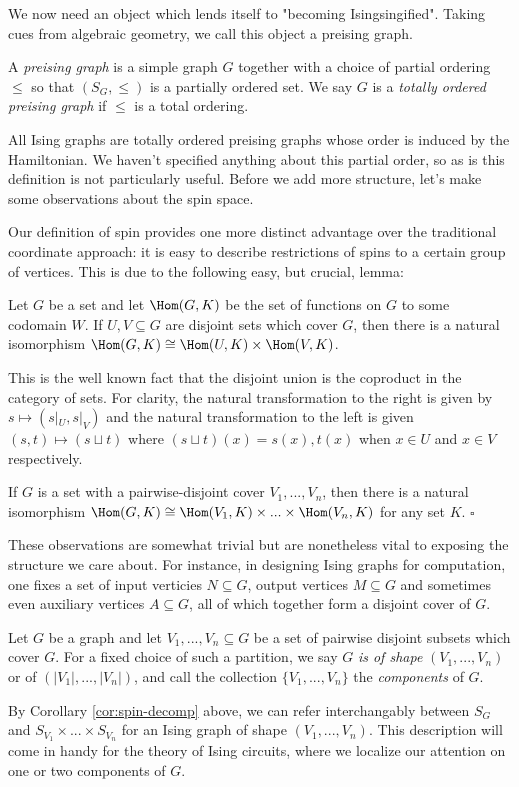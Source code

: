 We now need an object which lends itself to "becoming Isingsingified". Taking cues from algebraic geometry, we call this object a preising graph.
\begin{defn}\label{defn:preising-graph}
	A \emph{preising graph} is a simple graph $G$ together with a choice of partial ordering $\leq$ so that $(S_G,\leq)$ is a partially ordered set. We say $G$ is a \emph{totally ordered preising graph} if $\leq$ is a total ordering.
\end{defn}
All Ising graphs are totally ordered preising graphs whose order is induced by the Hamiltonian. We haven't specified anything about this partial order, so as is this definition is not particularly useful. Before we add more structure, let's make some observations about the spin space.

Our definition of spin provides one more distinct advantage over the traditional coordinate approach: it is easy to describe restrictions of spins to a certain group of vertices. This is due to the following easy, but crucial, lemma:
\begin{lem}\label{lem:spin-decomp}
	Let $G$ be a set and let $\Hom(G,K)$ be the set of functions on $G$ to some codomain $W$. If $U,V \subseteq G$ are disjoint sets which cover $G$, then there is a natural isomorphism $\Hom(G,K) \cong \Hom(U,K) \times \Hom(V,K)$.
\end{lem}
\begin{prf}
	This is the well known fact that the disjoint union is the coproduct in the category of sets. For clarity, the natural transformation to the right is given by $s \mapsto (s|_U,s|_V)$ and the natural transformation to the left is given $(s,t) \mapsto (s\sqcup t)$ where $(s\sqcup t)(x) = s(x), t(x)$ when $x \in U$ and $x \in V$ respectively.
\end{prf}
\begin{cor}\label{cor:spin-decomp}
	If $G$ is a set with a pairwise-disjoint cover $V_1,...,V_n$, then there is a natural isomorphism $\Hom(G,K)\cong \Hom(V_1,K)\times...\times \Hom(V_n, K)$ for any set $K$. \hfill $\square$
\end{cor}
These observations are somewhat trivial but are nonetheless vital to exposing the structure we care about. For instance, in designing Ising graphs for computation, one fixes a set of input verticies $N \subseteq G$, output vertices $M \subseteq G$ and sometimes even auxiliary vertices $A \subseteq G$, all of which together form a disjoint cover of $G$.
\begin{defn}\label{defn:shape-of-ising-graph}
	Let $G$ be a graph and let $V_1,...,V_n \subseteq G$ be a set of pairwise disjoint subsets which cover $G$. For a fixed choice of such a partition, we say $G$ \emph{is of shape} $(V_1,...,V_n)$ or of $(|V_1|,...,|V_n|)$, and call the collection $\{V_1,...,V_n\}$ the \emph{components} of $G$.
\end{defn}
By Corollary \ref{cor:spin-decomp} above, we can refer interchangably between $S_G$ and $S_{V_1}\times...\times S_{V_n}$ for an Ising graph of shape $(V_1,...,V_n)$. This description will come in handy for the theory of Ising circuits, where we localize our attention on one or two components of $G$.

